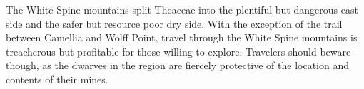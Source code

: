 The White Spine mountains split Theaceae into the plentiful but dangerous east side and the safer but resource poor dry side.
With the exception of the trail between Camellia and Wolff Point, travel through the White Spine mountains is treacherous but profitable for those willing to explore.
Travelers should beware though, as the dwarves in the region are fiercely protective of the location and contents of their mines.
